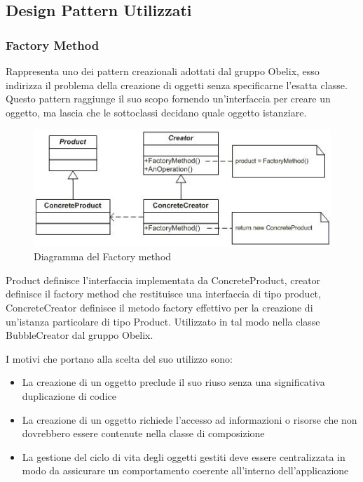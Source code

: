 \subsection{Design Pattern Utilizzati}

\subsubsection{Factory Method}
Rappresenta uno dei pattern creazionali adottati dal gruppo Obelix,
esso  indirizza il problema della creazione di oggetti senza
specificarne l'esatta classe. Questo pattern raggiunge il suo scopo
fornendo un'interfaccia per creare un oggetto, ma lascia che le
sottoclassi decidano quale oggetto istanziare. 

	\FloatBarrier
	\begin{figure}[ht]
		\centering
		\includegraphics[scale=0.45]{img/method.jpg}
		\caption{Diagramma del Factory method}
	\end{figure}


Product definisce l'interfaccia implementata da ConcreteProduct,
creator definisce il factory method che restituisce una interfaccia di
tipo product, ConcreteCreator definisce il metodo factory effettivo
per la creazione di un’istanza particolare di tipo Product. 
Utilizzato in tal modo nella classe BubbleCreator dal gruppo Obelix.


I motivi che portano alla scelta del suo utilizzo sono:

\begin{itemize}
\item La creazione di un oggetto preclude il suo riuso senza una significativa duplicazione di codice
\item  La creazione di un oggetto richiede l'accesso ad informazioni o risorse che non dovrebbero essere contenute nella classe di composizione
\item La gestione del ciclo di vita degli oggetti gestiti deve essere centralizzata in modo da assicurare un comportamento coerente all'interno dell'applicazione

\end{itemize}

